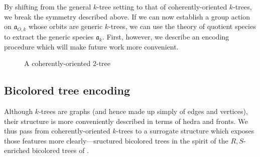 \documentclass[sectionflow,singlespace,twoside,boldmathhdr]{brandiss} %
\numberwithin{section}{chapter}
\numberwithin{figure}{chapter}
\begin{document}
By shifting from the general $k$-tree setting to that of coherently-oriented $k$-trees, we break the symmetry described above.
If we can now establish a group action on $\mathfrak{a}_{O, k}$ whose orbits are generic $k$-trees, we can use the theory of quotient species to extract the generic species $\mathfrak{a}_{k}$.
First, however, we describe an encoding procedure which will make future work more convenient.

\begin{figure}[htb]
  \centering
  \caption{A coherently-oriented $2$-tree}
  \label{fig:exco2tree}
\end{figure}

\subsection{Bicolored tree encoding}\label{ss:bctree}
Although $k$-trees are graphs (and hence made up simply of edges and vertices), their structure is more conveniently described in terms of hedra and fronts.
We thus pass from coherently-oriented $k$-trees to a surrogate structure which exposes those features more clearly---sructured bicolored trees in the spirit of the $R, S$-enriched bicolored trees of \cite[\S 3.2]{bll:species}.
\end{document}

